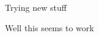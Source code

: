\documentclass{article}
\begin{document}
Trying new stuff

Well this seems to work


\newpage

 

\end{document}
